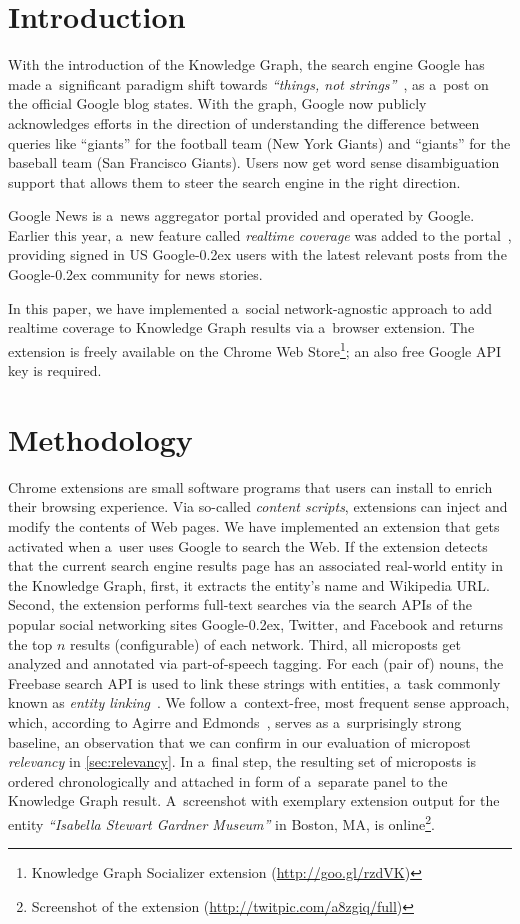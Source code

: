 \documentclass[runningheads,a4paper]{llncs}
\newcommand{\googleplus}{Google\nolinebreak\hspace{0em}\raisebox{.28ex}{\tiny\bf +}\kern-0.2ex\xspace}
\begin{document}
\section{Introduction}
With the introduction of the Knowledge Graph, the search engine Google
has made a~significant paradigm shift towards \textit{``things, not strings''}~\cite{singhal2012},
as a~post on the official Google blog states.
With the graph, Google now publicly acknowledges efforts in the direction of 
understanding the difference between queries like ``giants''
for the football team (New York Giants)
and ``giants'' for the baseball team (San Francisco Giants).
Users now get word sense disambiguation support that allows them
to steer the search engine in the right direction.

Google News is a~news aggregator portal provided and operated by Google.
Earlier this year, a~new feature called \emph{realtime coverage}
was added to the portal~\cite{zuccarino2012}, providing signed in US \googleplus users
with the latest relevant posts from the \googleplus community for news stories.

In this paper, we have implemented a~social network-agnostic approach
to add realtime coverage to Knowledge Graph results via a~browser extension.
The extension is freely available on the Chrome Web
Store\footnote{Knowledge Graph Socializer extension (\url{http://goo.gl/rzdVK})};
an also free Google API key is required.

\section{Methodology}
Chrome extensions are small software programs that users can install
to enrich their browsing experience.
Via so-called \emph{content scripts}, extensions can inject and modify the contents of Web pages.
We have implemented an extension that gets activated when a~user uses Google to search the Web.
If the extension detects that the current search engine results page
has an associated real-world entity in the Knowledge Graph,
first, it extracts the entity's name and Wikipedia URL.
Second, the extension performs full-text searches via the search APIs of
the popular social networking sites \googleplus, Twitter, and Facebook
and returns the top $n$ results (configurable) of each network.
Third, all microposts get analyzed and annotated via part-of-speech tagging.
For each (pair of) nouns, the Freebase search API is used
to link these strings with entities,
a~task commonly known as \emph{entity linking}~\cite{spitkovsky2012}.
We follow a~context-free, most frequent sense approach,
which, according to Agirre and Edmonds~\cite{agirre2007},
serves as a~surprisingly strong baseline,
an observation that we can confirm in our evaluation of micropost \emph{relevancy}
in \autoref{sec:relevancy}.
In a~final step, the resulting set of microposts is ordered chronologically
and attached in form of a~separate panel to the Knowledge Graph result.
A~screenshot with exemplary extension output for the entity
\emph{``Isabella Stewart Gardner Museum''} in Boston, MA,
is online\footnote{Screenshot of the extension (\url{http://twitpic.com/a8zgiq/full})}. 
\end{document}
